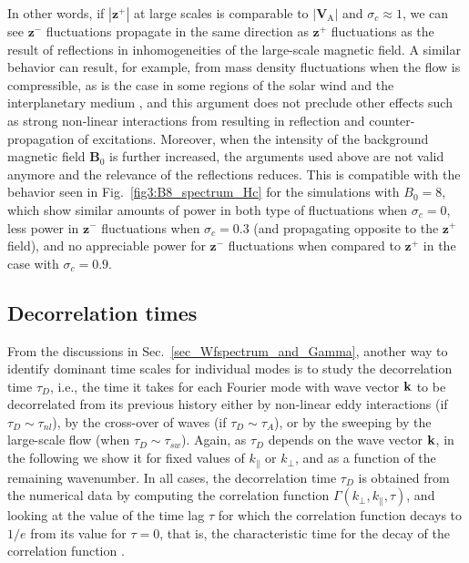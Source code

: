 \documentclass[aip,pop,reprint,amsmath,amssymb,floatfix]{revtex4-1}
\renewcommand{\vec}[1]{\mathbf{#1}}
\begin{document}
In other words, if $|\vec{z}^+|$ at large scales is comparable to
$|\vec{V}_\textrm{A}|$ and $\sigma_c \approx 1$, we can see $\vec{z}^-$
fluctuations propagate in the same direction as $\vec{z}^+$
fluctuations as the result of reflections in inhomogeneities of the
large-scale magnetic field. A similar behavior can result, for example, from mass
density fluctuations when the flow is compressible, as is the case in
some regions of the solar wind and the interplanetary medium \cite{zhou_1989_nonWKBevolution}, and this
argument does not preclude other effects such as strong non-linear
interactions from resulting in reflection and counter-propagation of
excitations. Moreover, when the intensity of the background magnetic
field $\vec{B}_0$ is further increased, the arguments used above are
not valid anymore and the relevance of the reflections reduces. This
is compatible with the behavior seen in Fig.~\ref{fig3:B8_spectrum_Hc}
for the simulations with $B_0=8$, which show similar amounts of power
in both type of fluctuations when $\sigma_c=0$, less power in $\vec{z}^-$
fluctuations when $\sigma_c=0.3$ (and propagating opposite to the
$\vec{z}^+$ field), and no appreciable power for $\vec{z}^-$
fluctuations when compared to $\vec{z}^+$ in the case with $\sigma_c=0.9$.

\subsection{Decorrelation times}

From the discussions in Sec.~\ref{sec_Wfspectrum_and_Gamma}, another
way to identify dominant time scales for individual modes is to study
the decorrelation time $\tau_D$, i.e., the time it takes for each
Fourier mode with wave vector ${\bf k}$ to be decorrelated from its
previous history either by non-linear eddy interactions (if
$\tau_D \sim \tau_{nl}$), by the cross-over of waves (if
$\tau_D \sim \tau_A$), or by the sweeping by the large-scale flow
(when $\tau_D \sim \tau_{sw}$). Again, as $\tau_D$ depends on the wave
vector ${\bf k}$, in the following we show it for fixed values of
$k_\parallel$ or $k_\perp$, and as a function of the remaining
wavenumber. In all cases, the decorrelation time $\tau_D$ is obtained
from the numerical data by computing the correlation function
$\Gamma(k_{\perp},k_{\parallel},\tau)$, and looking at the value of
the time lag $\tau$ for which the correlation function decays to $1/e$
from its value for $\tau=0$, that is, the characteristic time for the
decay of the correlation function \cite{lugones_2016_spatiotemporal}.
\end{document}
